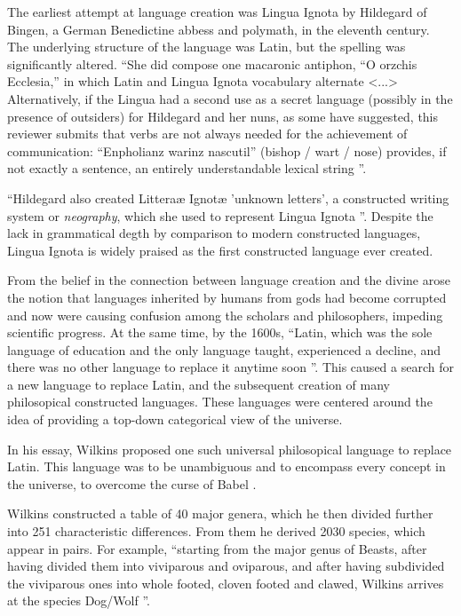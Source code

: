 \documentclass[14pt, a4paper]{extreport}
\begin{document}
The earliest attempt at language creation was Lingua Ignota by Hildegard of Bingen, a German Benedictine abbess and polymath, in the eleventh century. The underlying structure of the language was Latin, but the spelling was significantly altered. ``She did compose one macaronic antiphon, ``O orzchis Ecclesia,'' in which Latin and Lingua Ignota vocabulary alternate <...> Alternatively, if the Lingua had a second use as a secret language (possibly in the presence of outsiders) for Hildegard and her nuns, as some have suggested, this reviewer submits that verbs are not always needed for the achievement of communication: ``Enpholianz warinz nascutil'' (bishop / wart / nose) provides, if not exactly a sentence, an entirely understandable lexical string \parencite{higley}''.

``Hildegard also created Litteraæ Ignotæ 'unknown letters', a constructed writing system or \textit{neography}, which she used to represent Lingua Ignota \parencite{sanders}''. Despite the lack in grammatical degth by comparison to modern constructed languages, Lingua Ignota is widely praised as the first constructed language ever created.

From the belief in the connection between language creation and the divine arose the notion that languages inherited by humans from gods had become corrupted and now were causing confusion among the scholars and philosophers, impeding scientific progress. At the same time, by the 1600s, ``Latin, which was the sole language of education and the only language taught, experienced a decline, and there was no other language to replace it anytime soon \parencite[51]{stria}''. This caused a search for a new language to replace Latin, and the subsequent creation of many philosopical constructed languages. These languages were centered around the idea of providing a top-down categorical view of the universe.

In his essay, Wilkins proposed one such universal philosopical language to replace Latin. This language was to be unambiguous and to encompass every concept in the universe, to overcome the curse of Babel \parencite[ch. 2, p. 1]{wilkins}.

Wilkins constructed a table of 40 major genera, which he then divided further into 251 characteristic differences. From them he derived 2030 species, which appear in pairs. For example, ``starting from the major genus of Beasts, after having divided them into viviparous and oviparous, and after having subdivided the viviparous ones into whole footed, cloven footed and clawed, Wilkins arrives at the species Dog/Wolf \parencite[239]{eco}''.
\end{document}
